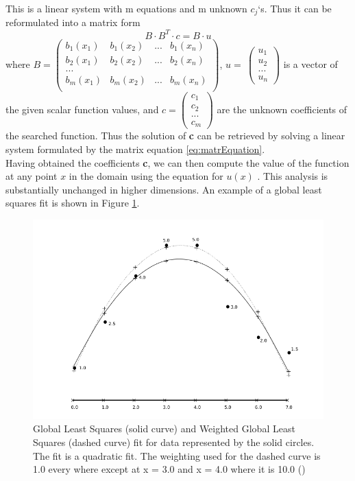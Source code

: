 This is a linear system with m equations and m unknown $c_j$`s. Thus it can be reformulated into a matrix form
\begin{equation}
 B \cdot B^T \cdot c  = B\cdot u
 \label{eq:matrEquation}
\end{equation}
where $B = 
\begin{pmatrix}
	b_1(x_1) & b_1(x_2) & ... & b_1(x_n)\\
	b_2(x_1) & b_2(x_2) & ... & b_2(x_n)\\
	...\\
	b_m(x_1) & b_m(x_2) & ... & b_m(x_n)\\
\end{pmatrix}$, $u = \
\begin{pmatrix}
	u_1\\
	u_2\\
	...\\
	u_n
\end{pmatrix}$ is a vector of the given scalar function values, and $c = 
\begin{pmatrix}
	c_1\\
	c_2\\
	...\\
	c_m
\end{pmatrix}$ are the unknown coefficients of the searched function. Thus the solution of \textbf{c} can be retrieved by solving a linear system formulated by the matrix equation \ref{eq:matrEquation}.\\
Having obtained the coefficients \textbf{c}, we can then compute the value of the function at any point $x$ in the domain using the equation for $u(x)$ . This analysis is substantially unchanged in higher dimensions. An example of a global least squares fit is shown in Figure \ref{fig:gls_example}.
\begin{figure}[h!]
	\begin{center}
		\includegraphics[width=\textwidth]{figures/GLS.png}
	\end{center}
	\caption{Global Least Squares (solid curve) and Weighted Global Least Squares (dashed curve) fit for data represented by the solid circles. The fit is a quadratic fit. The weighting used for the dashed curve is 1.0 every where except at x = 3.0 and x = 4.0 where it is 10.0 (\cite{MLSIntro})}
	\label{fig:gls_example}
\end{figure}
